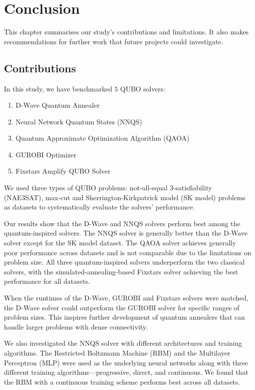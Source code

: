 \chapter{Conclusion}

This chapter summarises our study's contributions and limitations. It also makes recommendations for further work that future projects could investigate.

\section{Contributions}
In this study, we have benchmarked $5$ QUBO solvers:
\begin{enumerate}
    \item D-Wave Quantum Annealer
    \item Neural Network Quantum States (NNQS)
    \item Quantum Approximate Optimization Algorithm (QAOA)
    \item GUROBI Optimizer
    \item Fixstars Amplify QUBO Solver
\end{enumerate}
We used three types of QUBO problems: not-all-equal 3-satisfiability (NAE3SAT), max-cut and Sherrington-Kirkpatrick model (SK model) problems as datasets to systematically evaluate the solvers' performance.

Our results show that the D-Wave and NNQS solvers perform best among the quantum-inspired solvers. The NNQS solver is generally better than the D-Wave solver except for the SK model dataset. The QAOA solver achieves generally poor performance across datasets and is not comparable due to the limitations on problem size. All three quantum-inspired solvers underperform the two classical solvers, with the simulated-annealing-based Fixstars solver achieving the best performance for all datasets.

When the runtimes of the D-Wave, GUROBI and Fixstars solvers were matched, the D-Wave solver could outperform the GUROBI solver for specific ranges of problem sizes. This inspires further development of quantum annealers that can handle larger problems with dense connectivity.

We also investigated the NNQS solver with different architectures and training algorithms. The Restricted Boltzmann Machine (RBM) and the Multilayer Perceptron (MLP) were used as the underlying neural networks along with three different training algorithms---progressive, direct, and continuous. We found that the RBM with a continuous training scheme performs best across all datasets.


